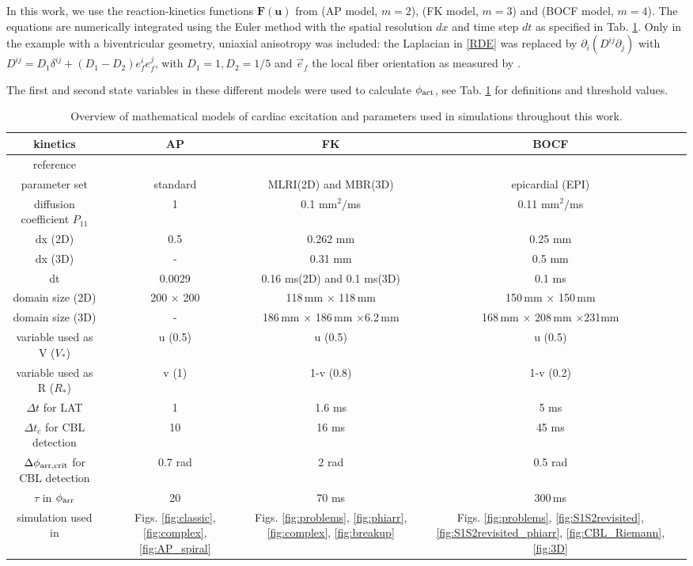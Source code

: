 \documentclass{article}
\newcommand{\phiact}{\ensuremath{\phi_{\rm act}}}
\newcommand{\phiarr}{\ensuremath{\phi_{\rm arr}}}
\newcommand{\VS}{V_*}
\newcommand{\RS}{R_*}
\newcommand{\uu}{\mathbf{u}}
\newcommand{\dd}{\partial}
\begin{document}
In this work, we use the reaction-kinetics functions $\mathbf{F}(\uu)$ from \cite{Aliev:1996} (AP model, $m=2$), \cite{Fenton:1998} (FK model, $m=3$) and \cite{BuenoOrovio:2008} (BOCF model, $m=4$). The equations are numerically integrated using the Euler method with the spatial resolution $dx$ and time step $dt$ as specified in Tab. \ref{tab:sims}. Only in the example with a biventricular geometry, uniaxial anisotropy was included: the Laplacian in \eqref{RDE} was replaced by $\dd_i (D^{ij} \dd_j)$ with $D^{ij} = D_1 \delta^{ij} + (D_1-D_2) e_f^i e^j_f$, with $D_1=1, D_2=1/5$ and $\vec{e}_f$ the local fiber orientation as measured by \cite{Hren:1995}. 

The first and second state variables in these different models were used to calculate $\phiact$, see Tab. \ref{tab:sims} for definitions and threshold values. 

\begin{table}[b]
    \centering
    \begin{tabular}{c|ccc}
    kinetics & AP & FK & BOCF \\ \hline
    reference & \small{\citep{Aliev:1996}} & \small{\citep{Fenton:1998}} & \tiny{\citep{BuenoOrovio:2008}} \\
    parameter set & standard & MLRI(2D) and MBR(3D) & epicardial (EPI) \\
    diffusion coefficient $P_{11}$ & 1 & 0.1 mm$^2/$ms & 0.11 mm$^2/$ms  \\
    dx (2D) & 0.5  & 0.262 mm & 0.25 mm \\ 
    dx (3D)  & - & 0.31 mm & 0.5 mm \\ 
    dt & 0.0029 & 0.16 ms(2D) and 0.1 ms(3D) & 0.1 ms \\
   domain size (2D) & 200 $\times$ 200 &  118\,mm $\times$ 118\,mm & 150\,mm $\times$ 150\,mm \\
  domain size (3D) & -  & \tiny{186\,mm $\times$ 186\,mm $\times $6.2\,mm} & \tiny{168\,mm $\times$ 208\,mm $\times $231mm} \\
    variable used as V ($\VS$) & u (0.5) & u (0.5) &u (0.5)  \\
    variable used as R ($\RS$) & v (1) & 1-v (0.8) & 1-v (0.2) \\
    $\Delta t$ for LAT & 1 & 1.6 ms & 5 ms\\
    $\Delta t_c$ for CBL detection & 10 & 16 ms & 45 ms\\
    $\Delta\phi_{\rm arr, crit}$ for CBL detection & 0.7 rad & 2 rad  & 0.5 rad \\
   $\tau$ in $\phiarr$& 20 & 70 ms & 300\,ms \\
    simulation used in &  Figs. \ref{fig:classic}, \ref{fig:complex}, \ref{fig:AP_spiral} & Figs. \ref{fig:problems}, \ref{fig:phiarr}, \ref{fig:complex}, \ref{fig:breakup} & Figs. \ref{fig:problems}, \ref{fig:S1S2revisited}, \ref{fig:S1S2revisited_phiarr}, \ref{fig:CBL_Riemann}, \ref{fig:3D} \\ %
    \end{tabular}
    \caption{Overview of mathematical models of cardiac excitation and parameters used in simulations throughout this work. }
    \label{tab:sims}
\end{table}
\end{document}
